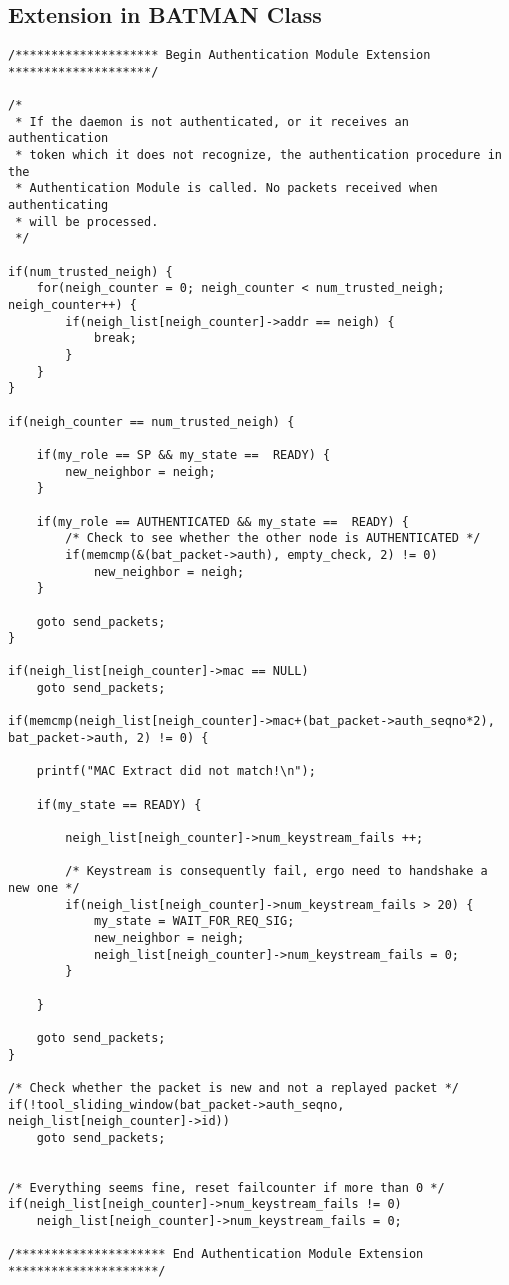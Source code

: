 \subsection{Extension in BATMAN Class}\label{code:ext_batman}
\begin{lstlisting}[frame=tb]
/******************** Begin Authentication Module Extension ********************/

/*
 * If the daemon is not authenticated, or it receives an authentication
 * token which it does not recognize, the authentication procedure in the
 * Authentication Module is called. No packets received when authenticating
 * will be processed.
 */

if(num_trusted_neigh) {
	for(neigh_counter = 0; neigh_counter < num_trusted_neigh; neigh_counter++) {
		if(neigh_list[neigh_counter]->addr == neigh) {
			break;
		}
	}
}

if(neigh_counter == num_trusted_neigh) {

	if(my_role == SP && my_state ==  READY) {
		new_neighbor = neigh;
	}

	if(my_role == AUTHENTICATED && my_state ==  READY) {
		/* Check to see whether the other node is AUTHENTICATED */
		if(memcmp(&(bat_packet->auth), empty_check, 2) != 0)
			new_neighbor = neigh;
	}

	goto send_packets;
}

if(neigh_list[neigh_counter]->mac == NULL)
	goto send_packets;

if(memcmp(neigh_list[neigh_counter]->mac+(bat_packet->auth_seqno*2), bat_packet->auth, 2) != 0) {

	printf("MAC Extract did not match!\n");

	if(my_state == READY) {

		neigh_list[neigh_counter]->num_keystream_fails ++;

		/* Keystream is consequently fail, ergo need to handshake a new one */
		if(neigh_list[neigh_counter]->num_keystream_fails > 20) {
			my_state = WAIT_FOR_REQ_SIG;
			new_neighbor = neigh;
			neigh_list[neigh_counter]->num_keystream_fails = 0;
		}

	}

	goto send_packets;
}

/* Check whether the packet is new and not a replayed packet */
if(!tool_sliding_window(bat_packet->auth_seqno, neigh_list[neigh_counter]->id))
	goto send_packets;


/* Everything seems fine, reset failcounter if more than 0 */
if(neigh_list[neigh_counter]->num_keystream_fails != 0)
	neigh_list[neigh_counter]->num_keystream_fails = 0;

/********************* End Authentication Module Extension *********************/
\end{lstlisting}

